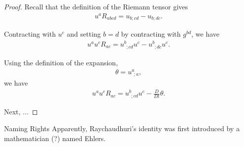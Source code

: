 \begin{proof}
    Recall that the definition of the Riemann tensor gives
    \begin{align}
        u^a R_{abcd} = u_{b;cd} - u_{b;dc}
        .
    \end{align}
    
    Contracting with \(u^c\) and setting \(b = d\) by contracting with \(g^{bd}\), we have
    \begin{align}
        u^a u^c R_{ac} = u^b_{~~;cd} u^c - u^b_{~~;dc} u^c
        .
    \end{align}
    
    Using the definition of the expansion,
    \begin{align}
        \theta = u^a_{~~;a},
    \end{align}
we have
    \begin{align}
        u^a u^c R_{ac} = u^b_{~~;cd} u^c - \frac{D}{Dt}\theta
        .
    \end{align}
    
    Next, ...


\end{proof}






\begin{remark}{Naming Rights}{}
    Apparently, %
    Raychaudhuri's identity was first introduced by a mathematician (?) named Ehlers.
\end{remark}


